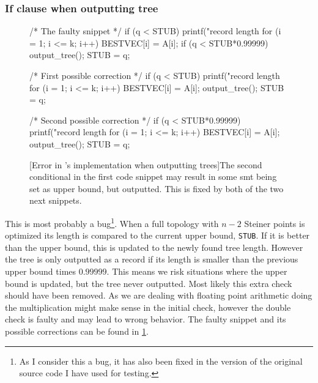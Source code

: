 \subsubsection{If clause when outputting tree}
\label{sec:if-clause-when}

\begin{figure}[htbp]
\begin{c-code}
/* The faulty snippet */
if (q < STUB) {
  printf("\nnew record length %
  for (i = 1; i <= k; i++) BESTVEC[i] = A[i];
  if (q < STUB*0.99999) output_tree();
  STUB = q;
}

/* First possible correction */
if (q < STUB) {
  printf("\nnew record length %
  for (i = 1; i <= k; i++) BESTVEC[i] = A[i];
  output_tree();
  STUB = q;
}

/* Second possible correction */
if (q < STUB*0.99999) {
  printf("\nnew record length %
  for (i = 1; i <= k; i++) BESTVEC[i] = A[i];
  output_tree();
  STUB = q;
}
\end{c-code}
  [Error in \citeauthor{smith1992}'s implementation when outputting trees]{The
    second conditional in the first code snippet may result in some \ac{smt}
    being set as upper bound, but outputted. This is fixed by both of the two
    next snippets.\label{fig:if-clause-snippet}}
\end{figure}

This is most probably a bug\footnote{As I consider this a bug, it has also been
  fixed in the version of the original source code I have used for
  testing.}. When a full topology with $n-2$ Steiner points is optimized its
length is compared to the current upper bound, \texttt{STUB}. If it is better
than the upper bound, this is updated to the newly found tree length. However
the tree is only outputted as a record if its length is smaller than the
previous upper bound times $0.99999$. This means we risk situations where the
upper bound is updated, but the tree never outputted. Most likely this extra
check should have been removed. As we are dealing with floating point arithmetic
doing the multiplication might make sense in the initial check, however the
double check is faulty and may lead to wrong behavior. The faulty snippet and
its possible corrections can be found in \cref{fig:if-clause-snippet}.

